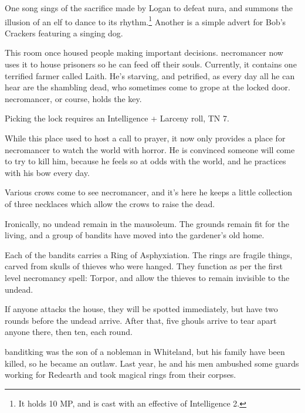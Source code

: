 \begin{multicols}{2}
One song sings of the sacrifice made by Logan to defeat nura, and summons the illusion of an elf to dance to its rhythm.\footnote{It holds 10 MP, and is cast with an effective of Intelligence 2.}
Another is a simple advert for Bob's Crackers featuring a singing dog.


This room once housed people making important decisions.  \Gls{necromancer} now uses it to house prisoners so he can feed off their souls.
Currently, it contains one terrified farmer called Laith.
He's starving, and petrified, as every day all he can hear are the shambling dead, who sometimes come to grope at the locked door.
\Gls{necromancer}, or course, holds the key.

Picking the lock requires an Intelligence + Larceny roll, TN 7.


\humanfarmer



While this place used to host a call to prayer, it now only provides a place for \gls{necromancer} to watch the world with horror.  He is convinced someone will come to try to kill him, because he feels so at odds with the world, and he practices with his bow every day.

Various crows come to see \gls{necromancer}, and it's here he keeps a little collection of three necklaces which allow the crows to raise the dead.


Ironically, no undead remain in the mausoleum.  The grounds remain fit for the living, and a group of bandits have moved into the gardener's old home.

Each of the bandits carries a Ring of Asphyxiation.
The rings are fragile things, carved from skulls of thieves who were hanged.
They function as per the first level necromancy spell: Torpor, and allow the thieves to remain invisible to the undead.

If anyone attacks the house, they will be spotted immediately, but have two rounds before the undead arrive.
After that, five ghouls arrive to tear apart anyone there, then ten, each round.



\Gls{banditking} was the son of a nobleman in Whiteland, but his family have been killed, so he became an outlaw.
Last year, he and his men ambushed some guards working for Redearth and took magical rings from their corpses.


\end{multicols}
